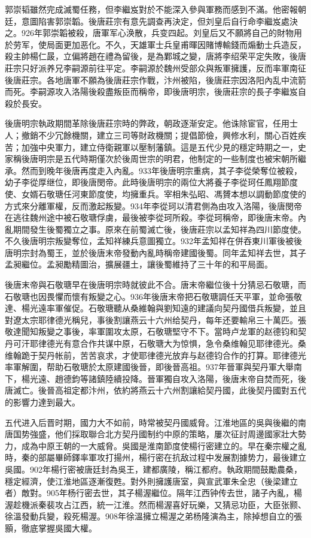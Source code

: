 郭崇韬雖然完成滅蜀任務，但李繼岌對於不能深入參與軍務而感到不滿。他密報朝廷，意圖陷害郭崇韜。後唐莊宗有意先調查再決定，但刘皇后自行命李繼岌處決之。926年郭崇韜被殺，唐軍军心涣散，兵变四起。刘皇后又不願將自己的財物用於劳军，使局面更加恶化。不久，天雄軍士兵皇甫暉因賭博輸錢而煽動士兵造反，殺主帥楊仁晸，立偏將趙在禮為留後，是為鄴城之變，唐將李绍荣平定失敗，後唐莊宗只好派养兄李嗣源前往平定。李嗣源於魏州受部众與叛軍擁護，反而率軍南征後唐莊宗。各地唐軍不願為後唐莊宗作戰，汴州被陷，後唐莊宗因洛阳內乱中流箭而死。李嗣源攻入洛陽後殺盡叛臣而稱帝，即後唐明宗，後唐莊宗的長子李繼岌自殺於長安。

後唐明宗執政期間革除後唐莊宗時的弊政，朝政逐渐安定。他诛除宦官，任用士人；撤銷不少冗餘機關，建立三司等財政機關；提倡節儉，興修水利，關心百姓疾苦；加強中央軍力，建立侍衛親軍以壓制藩鎮。這是五代少見的穩定時期之一，史家稱後唐明宗是五代時期僅次於後周世宗的明君，他制定的一些制度也被宋朝所繼承。然而到晚年後唐再度走入內亂。933年後唐明宗重病，其子李從榮奪位被殺，幼子李從厚继位，即後唐閔帝。此時後唐明宗的兩位大將養子李從珂任鳳翔節度使、女婿石敬瑭任河東節度使，均擁重兵。宰相朱弘昭、馮贇本想以調動節度使的方式來分離軍權，反而激起叛變。934年李從珂以清君側為由攻入洛陽，後唐閔帝在逃往魏州途中被石敬瑭俘虜，最後被李從珂所殺。李從珂稱帝，即後唐末帝。內亂期間發生後蜀獨立之事。原來在前蜀滅亡後，後唐莊宗以孟知祥為四川節度使。不久後唐明宗叛變奪位，孟知祥練兵意圖獨立。932年孟知祥在併吞東川軍後被後唐明宗封為蜀王，並於後唐末帝發動內亂時稱帝建國後蜀。同年孟知祥去世，其子孟昶繼位。孟昶勵精圖治，擴展疆土，讓後蜀維持了三十年的和平局面。

後唐末帝與石敬瑭早在後唐明宗時就彼此不合。唐末帝繼位後十分猜忌石敬瑭，而石敬瑭也因畏懼而懷有叛變之心。936年後唐末帝把石敬瑭調任天平軍，並命張敬達、楊光遠率軍催促。石敬瑭聽从桑維翰與劉知遠的建議向契丹國借兵叛變，並且對遼太宗耶律德光稱兒，事後割讓燕云十六州给契丹，每年还要輸帛三十萬匹。張敬達聞知叛變之事後，率軍圍攻太原，石敬瑭堅守不下。當時卢龙軍的赵德钧和契丹可汗耶律德光有意合作共谋中原，石敬瑭大为惊惧，急令桑维翰见耶律德光。桑维翰跪于契丹帐前，苦苦哀求，才使耶律德光放弃与赵德钧合作的打算。耶律德光率軍解圍，帮助石敬瑭於太原建國後晉，即後晉高祖。937年晉軍與契丹軍大舉南下，楊光遠、趙德鈞等諸鎮陸續投降。晉軍獨自攻入洛陽，後唐末帝自焚而死，後唐滅亡。後晉高祖定都汴州，依約將燕云十六州割讓給契丹國，此後契丹國對五代的影響力達到最大。

五代进入后晋时期，國力大不如前，時常被契丹國威脅。江淮地區的吳與後繼的南唐国势強盛，他们採取聯合北方契丹國制约中原的策略，屢次征討周邊國家壯大勢力，成為中原王朝的一大威脅。吳國是淮南節度使楊行密建立的。早在秦宗權之亂時，秦的部屬畢師鐸率軍攻打揚州，楊行密在抗敌过程中发展割據势力，最後建立吳國。902年楊行密被唐廷封為吳王，建都廣陵，稱江都府。執政期間鼓勵農桑，穩定經濟，使江淮地區逐漸復甦。對外則擁護唐室，與宣武軍朱全忠（後梁建立者）敵對。905年杨行密去世，其子楊渥繼位。隔年江西钟传去世，諸子內亂，楊渥趁機派秦裴攻占江西，統一江淮。然而楊渥喜好玩樂，又猜忌功臣，大臣张颢、徐溫發動兵變，殺死楊渥。908年徐溫擁立楊渥之弟杨隆演為主，除掉想自立的張顥，徹底掌握吳國大權。


